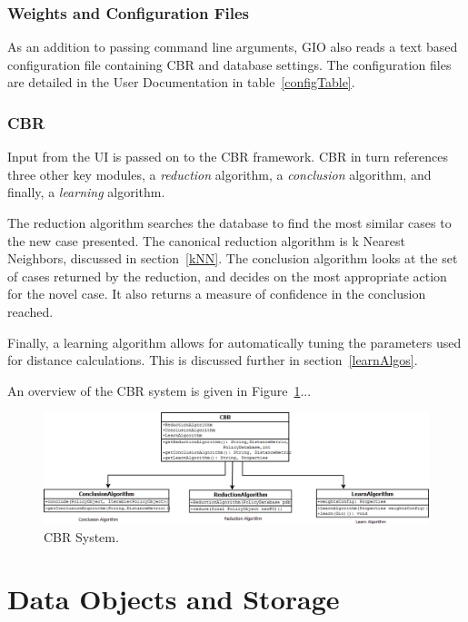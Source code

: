 \subsubsection{Weights and Configuration Files}
As an addition to passing command line arguments, GIO also reads a text based configuration file containing CBR and database settings. The configuration files are detailed in the User Documentation in table~\ref{configTable}. 

\subsubsection{CBR} %
Input from the UI is passed on to the CBR framework. CBR in turn references three other key modules, a \emph{reduction} algorithm, a \emph{conclusion} algorithm, and finally, a \emph{learning} algorithm.

The reduction algorithm searches the database to find the most similar cases to the new case presented. The canonical reduction algorithm is k Nearest Neighbors, discussed in section~\ref{kNN}. The conclusion algorithm looks at the set of cases returned by the reduction, and decides on the most appropriate action for the novel case. It also returns a measure of confidence in the conclusion reached.

Finally, a learning algorithm allows for automatically tuning the parameters used for distance calculations. This is discussed further in section~\ref{learnAlgos}.

An overview of the CBR system is given in Figure~\ref{cbr_fig}...


\begin{figure}[htbp]
\begin{center}
\includegraphics[width = \textwidth]{DesignReport/uml/CBR.png}
\caption{CBR System.}
\label{cbr_fig}
\end{center}
\end{figure}




\section{Data Objects and Storage}

